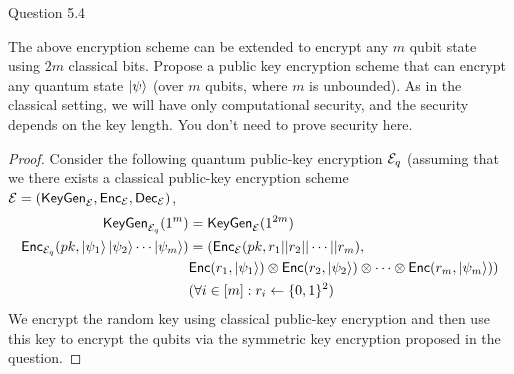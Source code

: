 \begin{solution}{Question 5.4}\label{ques:5.4}
    \begin{question}
    The above encryption scheme can be extended to encrypt any $m$ qubit state using $2m$ classical bits. Propose a public key encryption scheme that can encrypt any quantum state $\ket{\psi}$ (over $m$ qubits, where $m$ is unbounded). As in the classical setting, we will have only computational security, and the security depends on the key length. You don’t need to prove security here.
    \end{question}
    \tcblower{}
    \begin{proof}
        Consider the following quantum public-key encryption $\mathcal{E}_q$ (assuming that we there exists a classical public-key encryption scheme $\mathcal{E} = (\mathsf{KeyGen}_{\mathcal{E}}, \mathsf{Enc}_{\mathcal{E}}, \mathsf{Dec}_{\mathcal{E}})$,
        \begin{equation}
            \begin{split}
                \mathsf{KeyGen}_{\mathcal{E}_q}(1^m) &= \mathsf{KeyGen}_{\mathcal{E}}(1^{2m})\\
                \mathsf{Enc}_{\mathcal{E}_q}(pk, \ket{\psi_1}\ket{\psi_2}\cdots\ket{\psi_m}) &= (\mathsf{Enc}_{\mathcal{E}}(pk, r_1||r_2||\cdots||r_m),\\
                &\mathsf{Enc}(r_1, \ket{\psi_1})\otimes\mathsf{Enc}(r_2, \ket{\psi_2})\otimes\cdots\otimes\mathsf{Enc}(r_m, \ket{\psi_m}))\\
                &(\forall i\in[m]: r_i\gets \{0, 1\}^2)
            \end{split}
        \end{equation}
        We encrypt the random key using classical public-key encryption and then use this key to encrypt the qubits via the symmetric key encryption proposed in the question.
    \end{proof}
\end{solution}
